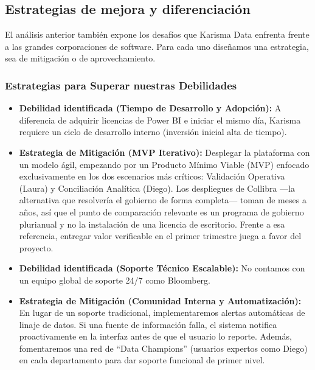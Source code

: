 \subsection{Estrategias de mejora y diferenciación}

El análisis anterior también expone los desafíos que Karisma Data enfrenta frente a las grandes corporaciones de software. Para cada uno diseñamos una estrategia, sea de mitigación o de aprovechamiento.

\subsubsection{Estrategias para Superar nuestras Debilidades}
\begin{itemize}
    \item \textbf{Debilidad identificada (Tiempo de Desarrollo y Adopción):} A diferencia de adquirir licencias de Power BI e iniciar el mismo día, Karisma requiere un ciclo de desarrollo interno (inversión inicial alta de tiempo).
    \item \textbf{Estrategia de Mitigación (MVP Iterativo):} Desplegar la plataforma con un modelo ágil, empezando por un Producto Mínimo Viable (MVP) enfocado exclusivamente en los dos escenarios más críticos: Validación Operativa (Laura) y Conciliación Analítica (Diego). Los despliegues de Collibra —la alternativa que resolvería el gobierno de forma completa— toman de meses a años, así que el punto de comparación relevante es un programa de gobierno plurianual y no la instalación de una licencia de escritorio. Frente a esa referencia, entregar valor verificable en el primer trimestre juega a favor del proyecto.
    \item \textbf{Debilidad identificada (Soporte Técnico Escalable):} No contamos con un equipo global de soporte 24/7 como Bloomberg.
    \item \textbf{Estrategia de Mitigación (Comunidad Interna y Automatización):} En lugar de un soporte tradicional, implementaremos alertas automáticas de linaje de datos. Si una fuente de información falla, el sistema notifica proactivamente en la interfaz antes de que el usuario lo reporte. Además, fomentaremos una red de ``Data Champions'' (usuarios expertos como Diego) en cada departamento para dar soporte funcional de primer nivel.
\end{itemize}

